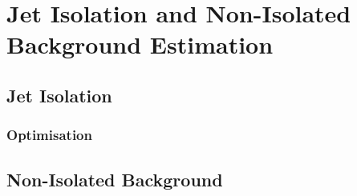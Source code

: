 \chapter{Jet Isolation and Non-Isolated Background Estimation}

\section{Jet Isolation}
\subsection{Optimisation}

\section{Non-Isolated Background}